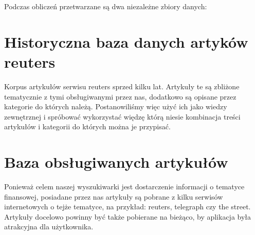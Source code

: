 Podczas obliczeń przetwarzane są dwa niezależne zbiory danych:
\section{Historyczna baza danych artyków reuters}
Korpus artykułów serwisu reuters sprzed kilku lat. Artykuły te są zbliżone tematycznie z tymi obsługiwanymi przez nas, dodatkowo są opisane przez kategorie do których należą. Postanowiliśmy więc użyć ich jako wiedzy zewnętrznej i spróbować wykorzystać więdzę którą niesie kombinacja treści artykułów i kategorii do których można je przypisać.

\section{Baza obsługiwanych artykułów}
Ponieważ celem naszej wyszukiwarki jest dostarczenie informacji o tematyce finansowej, 
posiadane przez nas artykuły są pobrane z kilku serwisów internetowych o tejże tematyce, na przykład: reuters, telegraph czy the street. Artykuły docelowo powinny być także pobierane na bieżąco, by aplikacja była atrakcyjna dla użytkownika.